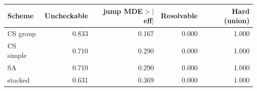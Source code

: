 \begin{tabular}{lrrrr}
\toprule
Scheme & Uncheckable & jump MDE$>|$eff$|$ & Resolvable & Hard (union) \\
\midrule
CS group & 0.833 & 0.167 & 0.000 & 1.000 \\
CS simple & 0.710 & 0.290 & 0.000 & 1.000 \\
SA & 0.710 & 0.290 & 0.000 & 1.000 \\
stacked & 0.631 & 0.369 & 0.000 & 1.000 \\
\bottomrule
\end{tabular}
